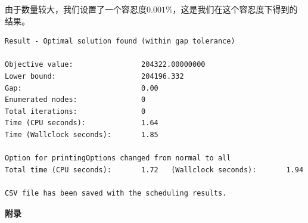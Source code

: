 \documentclass[UTF8,a4paper,10 pt]{article}%
\begin{document}
由于数量较大，我们设置了一个容忍度\(0.001\%\)，这是我们在这个容忍度下得到的结果。
\begin{lstlisting}
Result - Optimal solution found (within gap tolerance)

Objective value:                204322.00000000
Lower bound:                    204196.332
Gap:                            0.00
Enumerated nodes:               0
Total iterations:               0
Time (CPU seconds):             1.64
Time (Wallclock seconds):       1.85

Option for printingOptions changed from normal to all
Total time (CPU seconds):       1.72   (Wallclock seconds):       1.94

CSV file has been saved with the scheduling results.
\end{lstlisting}










\clearpage
\begin{center}
    \huge \bf 附录
\end{center}
\appendix
\end{document}
